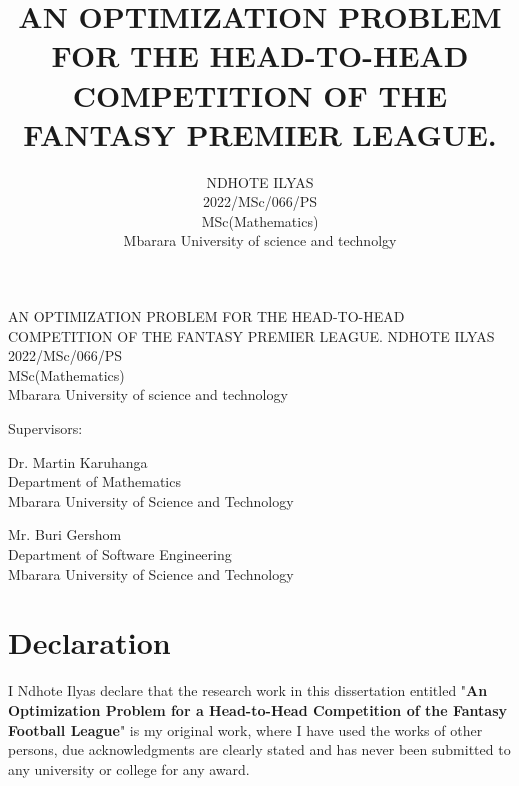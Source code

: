 	\begin{titlepage}
		\thispagestyle{empty}
		\title{AN OPTIMIZATION PROBLEM FOR THE HEAD-TO-HEAD COMPETITION OF THE FANTASY PREMIER LEAGUE. }
		\author{NDHOTE ILYAS \\2022/MSc/066/PS \\MSc(Mathematics)\\Mbarara University of science and technolgy }



		\begin{center}
			\vspace*{1cm}
			\Huge AN OPTIMIZATION PROBLEM FOR THE HEAD-TO-HEAD COMPETITION OF THE FANTASY PREMIER LEAGUE.
			\vfill
			\large{NDHOTE ILYAS \\2022/MSc/066/PS \\MSc(Mathematics)\\Mbarara University of science and technology }

			\vfill

			\begin{center}
				\large{Supervisors:}
			\end{center}

			\begin{center}
				\large{Dr. Martin Karuhanga}\\
				Department of Mathematics\\
				Mbarara University of Science and Technology
			\end{center}
			\begin{center}
				\large Mr. Buri Gershom\\
				Department of Software Engineering\\
				Mbarara University of Science and Technology
			\end{center}

		\end{center}

	\end{titlepage}

	\newpage
	\newpage
	\section*{Declaration}
		I Ndhote Ilyas declare that the research work in this dissertation entitled "\textbf{An Optimization Problem for a Head-to-Head Competition of the Fantasy Football League}" is my original work, where I have used the works of other persons, due acknowledgments are clearly stated and has never been submitted to any university or college for any award.\\

